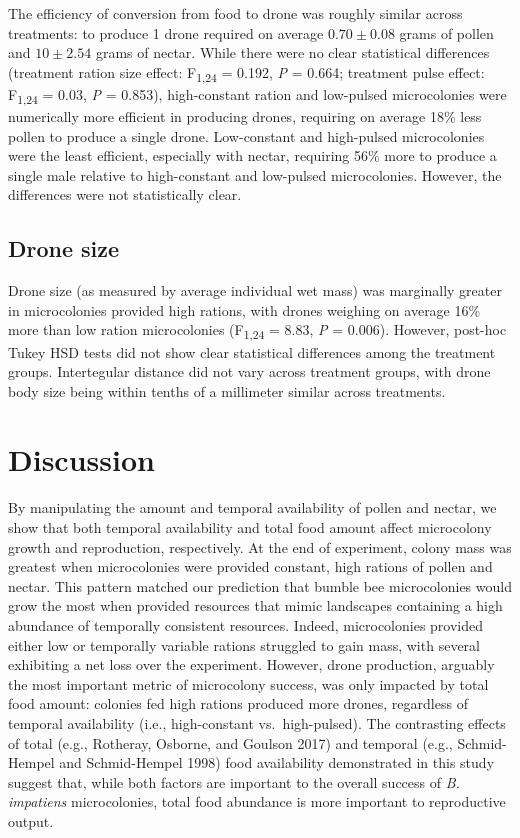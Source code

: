 \documentclass[11pt,]{article}
\begin{document}
The efficiency of conversion from food to drone was roughly similar
across treatments: to produce 1 drone required on average
\(0.70 \pm 0.08\) grams of pollen and \(10 \pm 2.54\) grams of nectar.
While there were no clear statistical differences (treatment ration size
effect: F\textsubscript{1,24} = 0.192, \emph{P} = 0.664; treatment pulse
effect: F\textsubscript{1,24} = 0.03, \emph{P} = 0.853), high-constant
ration and low-pulsed microcolonies were numerically more efficient in
producing drones, requiring on average 18\% less pollen to produce a
single drone. Low-constant and high-pulsed microcolonies were the least
efficient, especially with nectar, requiring 56\% more to produce a
single male relative to high-constant and low-pulsed microcolonies.
However, the differences were not statistically clear.

\hypertarget{drone-size}{%
\subsection{Drone size}\label{drone-size}}

Drone size (as measured by average individual wet mass) was marginally
greater in microcolonies provided high rations, with drones weighing on
average 16\% more than low ration microcolonies (F\textsubscript{1,24} =
8.83, \emph{P} = 0.006). However, post-hoc Tukey HSD tests did not show
clear statistical differences among the treatment groups. Intertegular
distance did not vary across treatment groups, with drone body size
being within tenths of a millimeter similar across treatments.

\hypertarget{discussion}{%
\section{Discussion}\label{discussion}}

By manipulating the amount and temporal availability of pollen and
nectar, we show that both temporal availability and total food amount
affect microcolony growth and reproduction, respectively. At the end of
experiment, colony mass was greatest when microcolonies were provided
constant, high rations of pollen and nectar. This pattern matched our
prediction that bumble bee microcolonies would grow the most when
provided resources that mimic landscapes containing a high abundance of
temporally consistent resources. Indeed, microcolonies provided either
low or temporally variable rations struggled to gain mass, with several
exhibiting a net loss over the experiment. However, drone production,
arguably the most important metric of microcolony success, was only
impacted by total food amount: colonies fed high rations produced more
drones, regardless of temporal availability (i.e., high-constant
vs.~high-pulsed). The contrasting effects of total (e.g., Rotheray,
Osborne, and Goulson 2017) and temporal (e.g., Schmid-Hempel and
Schmid-Hempel 1998) food availability demonstrated in this study suggest
that, while both factors are important to the overall success of
\emph{B. impatiens} microcolonies, total food abundance is more
important to reproductive output.
\end{document}
